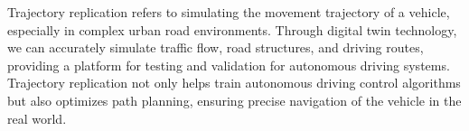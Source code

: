 Trajectory replication refers to simulating the movement trajectory of a vehicle, especially in complex urban road environments. 
Through digital twin technology, we can accurately simulate traffic flow, road structures, and driving routes, providing a platform for testing and validation for autonomous driving systems. 
Trajectory replication not only helps train autonomous driving control algorithms but also optimizes path planning, ensuring precise navigation of the vehicle in the real world\cite{Alpher24c}.

